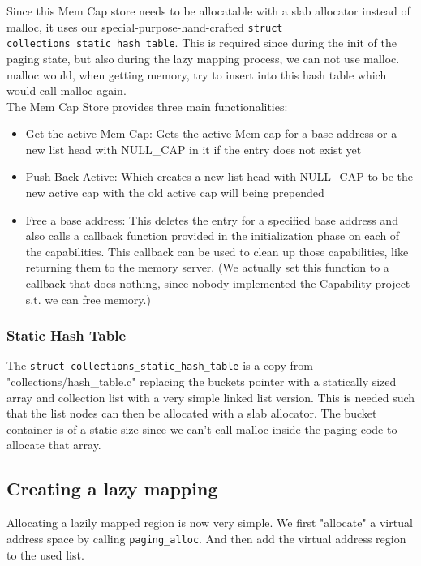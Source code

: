 Since this Mem Cap store needs to be allocatable with a slab allocator instead of malloc, it uses our special-purpose-hand-crafted  \texttt{struct collections_static_hash_table}. This is required since during the init of the paging state, but also during the lazy mapping process, we can not use malloc. malloc would, when getting memory, try to insert into this hash table which would call malloc again.\\
The Mem Cap Store provides three main functionalities:
\begin{itemize}
    \item Get the active Mem Cap: Gets the active Mem cap for a base address or a new list head with NULL\_CAP in it if the entry does not exist yet
    \item Push Back Active: Which creates a new list head with NULL\_CAP to be the new active cap with the old active cap will being prepended
    \item Free a base address: This deletes the entry for a specified base address and also calls a callback function provided in the initialization phase on each of the capabilities. This callback can be used to clean up those capabilities, like returning them to the memory server. (We actually set this function to a callback that does nothing, since nobody implemented the Capability project s.t. we can free memory.)
\end{itemize}



\subsubsection{Static Hash Table}
The  \texttt{struct collections_static_hash_table} is a copy from "collections/hash\_table.c" replacing the buckets pointer with a statically sized array and collection list with a very simple linked list version. This is needed such that the list nodes can then be allocated with a slab allocator. The bucket container is of a static size since we can't call malloc inside the paging code to allocate that array.

\subsection{Creating a lazy mapping}
Allocating a lazily mapped region is now very simple. We first "allocate" a virtual address space by calling \texttt{paging_alloc}. And then add the virtual address region to the used list.

